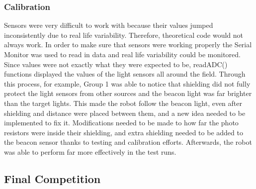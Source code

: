 \documentclass{article}
\begin{document}
    \subsubsection{Calibration}
    Sensors were very difficult to work with because their values jumped inconsistently due to real life variability. Therefore, theoretical code would not always work. In order to make sure that sensors were working properly the Serial Monitor was used to read in data and real life variability could be monitored. Since values were not exactly what they were expected to be, readADC() functions displayed the values of the light sensors all around the field. Through this process, for example, Group 1 was able to notice that shielding did not fully protect the light sensors from other sources and the beacon light was far brighter than the target lights. This made the robot follow the beacon light, even after shielding and distance were placed between them, and a new idea needed to be implemented to fix it. Modifications needed to be made to how far the photo resistors were inside their shielding, and extra shielding needed to be added to the beacon sensor thanks to testing and calibration efforts. Afterwards, the robot was able to perform far more effectively in the test runs.

\subsection{Final Competition}
\end{document}
